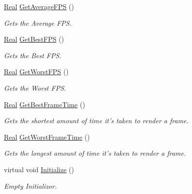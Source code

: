 \begin{DoxyCompactItemize}
\hyperlink{namespacephys_af7eb897198d265b8e868f45240230d5f}{Real} \hyperlink{classphys_1_1GraphicsManager_aaa43222ecf0a25841435651139539a94}{GetAverageFPS} ()
\begin{DoxyCompactList}\small\item\em Gets the Average FPS. \item\end{DoxyCompactList}\item 
\hyperlink{namespacephys_af7eb897198d265b8e868f45240230d5f}{Real} \hyperlink{classphys_1_1GraphicsManager_a6b644d683013467e1df4e115c4347be2}{GetBestFPS} ()
\begin{DoxyCompactList}\small\item\em Gets the Best FPS. \item\end{DoxyCompactList}\item 
\hyperlink{namespacephys_af7eb897198d265b8e868f45240230d5f}{Real} \hyperlink{classphys_1_1GraphicsManager_a52d675b375be04a02d6d91f27fb714a8}{GetWorstFPS} ()
\begin{DoxyCompactList}\small\item\em Gets the Worst FPS. \item\end{DoxyCompactList}\item 
\hyperlink{namespacephys_af7eb897198d265b8e868f45240230d5f}{Real} \hyperlink{classphys_1_1GraphicsManager_ab24bb81be1005487b2aab49af89c759c}{GetBestFrameTime} ()
\begin{DoxyCompactList}\small\item\em Gets the shortest amount of time it's taken to render a frame. \item\end{DoxyCompactList}\item 
\hyperlink{namespacephys_af7eb897198d265b8e868f45240230d5f}{Real} \hyperlink{classphys_1_1GraphicsManager_a96e6324466a121df5977446f019cee57}{GetWorstFrameTime} ()
\begin{DoxyCompactList}\small\item\em Gets the longest amount of time it's taken to render a frame. \item\end{DoxyCompactList}\item 
virtual void \hyperlink{classphys_1_1GraphicsManager_a554572de5d1cdce37aa1760d6e6e039c}{Initialize} ()
\begin{DoxyCompactList}\small\item\em Empty Initializor. \item\end{DoxyCompactList}\item 

\end{DoxyCompactItemize}
